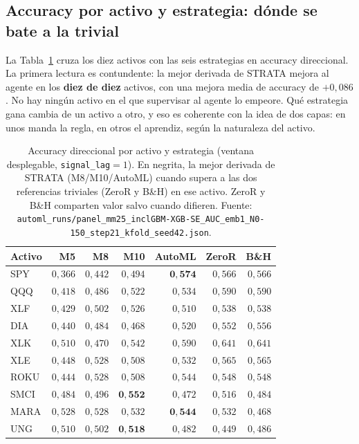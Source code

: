 \subsection{Accuracy por activo y estrategia: dónde se bate a la trivial}
\label{sec:mp-panel-tabla}

La Tabla~\ref{tab:mp-accuracy} cruza los diez activos con las seis estrategias en accuracy direccional. La primera lectura es contundente: la mejor derivada de STRATA mejora al agente en los \textbf{diez de diez} activos, con una mejora media de accuracy de $+0{,}086$. No hay ningún activo en el que supervisar al agente lo empeore. Qué estrategia gana cambia de un activo a otro, y eso es coherente con la idea de dos capas: en unos manda la regla, en otros el aprendiz, según la naturaleza del activo.

\begin{table}[htbp]
\centering
\caption{Accuracy direccional por activo y estrategia (ventana desplegable, \texttt{signal\_lag}${}=1$). En negrita, la mejor derivada de STRATA (M8/M10/AutoML) cuando supera a las dos referencias triviales (ZeroR y B\&H) en ese activo. ZeroR y B\&H comparten valor salvo cuando difieren. Fuente: \texttt{automl\_runs/panel\_mm25\_inclGBM-XGB-SE\_AUC\_emb1\_N0-150\_step21\_kfold\_seed42.json}.}
\label{tab:mp-accuracy}
\begin{tabular}{lrrrrrr}
\toprule
Activo & M5 & M8 & M10 & AutoML & ZeroR & B\&H \\
\midrule
SPY  & $0{,}366$ & $0{,}442$ & $0{,}494$ & $\mathbf{0{,}574}$ & $0{,}566$ & $0{,}566$ \\
QQQ  & $0{,}418$ & $0{,}486$ & $0{,}522$ & $0{,}534$ & $0{,}590$ & $0{,}590$ \\
XLF  & $0{,}429$ & $0{,}502$ & $0{,}526$ & $0{,}510$ & $0{,}538$ & $0{,}538$ \\
DIA  & $0{,}440$ & $0{,}484$ & $0{,}468$ & $0{,}520$ & $0{,}552$ & $0{,}556$ \\
XLK  & $0{,}510$ & $0{,}470$ & $0{,}542$ & $0{,}590$ & $0{,}641$ & $0{,}641$ \\
XLE  & $0{,}448$ & $0{,}528$ & $0{,}508$ & $0{,}532$ & $0{,}565$ & $0{,}565$ \\
ROKU & $0{,}444$ & $0{,}528$ & $0{,}508$ & $0{,}544$ & $0{,}548$ & $0{,}548$ \\
SMCI & $0{,}484$ & $0{,}496$ & $\mathbf{0{,}552}$ & $0{,}472$ & $0{,}516$ & $0{,}484$ \\
MARA & $0{,}528$ & $0{,}528$ & $0{,}532$ & $\mathbf{0{,}544}$ & $0{,}532$ & $0{,}468$ \\
UNG  & $0{,}510$ & $0{,}502$ & $\mathbf{0{,}518}$ & $0{,}482$ & $0{,}449$ & $0{,}486$ \\
\bottomrule
\end{tabular}
\end{table}


